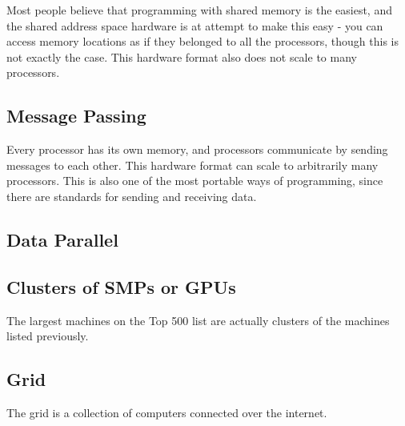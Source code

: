 \documentclass[10pt]{article}
\begin{document}
\begin{flushleft}
Most people believe that programming with shared memory is the easiest, and the shared address space hardware is at attempt to make this easy - you can access memory locations as if they belonged to all the processors, though this is not exactly the case. This hardware format also does not scale to many processors.

\subsection{Message Passing}

Every processor has its own memory, and processors communicate by sending messages to each other. This hardware format can scale to arbitrarily many processors. This is also one of the most portable ways of programming, since there are standards for sending and receiving data.

\subsection{Data Parallel}



\subsection{Clusters of SMPs or GPUs}

The largest machines on the Top 500 list are actually clusters of the machines listed previously. 

\subsection{Grid}

The grid is a collection of computers connected over the internet. 

\end{flushleft}
\end{document}
